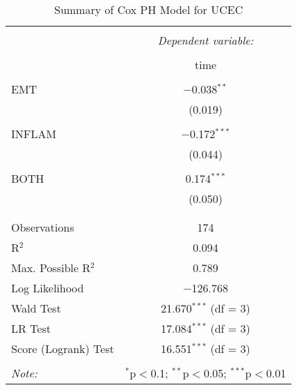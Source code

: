 
\begin{table}[!htbp] \centering 
  \caption{Summary of Cox PH Model for UCEC} 
  \label{table:UCEC_cph} 
\begin{tabular}{@{\extracolsep{5pt}}lc} 
\\[-1.8ex]\hline 
\hline \\[-1.8ex] 
 & \multicolumn{1}{c}{\textit{Dependent variable:}} \\ 
\cline{2-2} 
\\[-1.8ex] & time \\ 
\hline \\[-1.8ex] 
 EMT & $-$0.038$^{**}$ \\ 
  & (0.019) \\ 
  & \\ 
 INFLAM & $-$0.172$^{***}$ \\ 
  & (0.044) \\ 
  & \\ 
 BOTH & 0.174$^{***}$ \\ 
  & (0.050) \\ 
  & \\ 
\hline \\[-1.8ex] 
Observations & 174 \\ 
R$^{2}$ & 0.094 \\ 
Max. Possible R$^{2}$ & 0.789 \\ 
Log Likelihood & $-$126.768 \\ 
Wald Test & 21.670$^{***}$ (df = 3) \\ 
LR Test & 17.084$^{***}$ (df = 3) \\ 
Score (Logrank) Test & 16.551$^{***}$ (df = 3) \\ 
\hline 
\hline \\[-1.8ex] 
\textit{Note:}  & \multicolumn{1}{r}{$^{*}$p$<$0.1; $^{**}$p$<$0.05; $^{***}$p$<$0.01} \\ 
\end{tabular} 
\end{table} 
